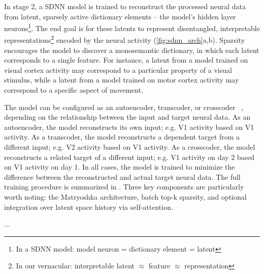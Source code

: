 In stage 2, a SDNN model is trained to reconstruct the processed neural data from latent, sparsely active dictionary elements -- the model's hidden layer neurons\footnote{In a SDNN model: model neuron = dictionary element = latent}. The end goal is for these latents to represent disentangled, interpretable representations\footnote{In our vernacular: interpretable latent $\approx$ feature $\approx$ representation} encoded by the neural activity (\autoref{fig:sdnn_arch}a,b). Sparsity encourages the model to discover a monosemantic dictionary, in which each latent corresponds to a single feature. For instance, a latent from a model trained on visual cortex activity may correspond to a particular property of a visual stimulus, while a latent from a model trained on motor cortex activity may correspond to a specific aspect of movement.

The model can be configured as an autoencoder, transcoder, or crosscoder ~\cite{lindsey_2024_crosscoders}, depending on the relationship between the input and target neural data. As an autoencoder, the model reconstructs its own input; e.g. V1 activity based on V1 activity. As a transcoder, the model reconstructs a dependent target from a different input; e.g. V2 activity based on V1 activity. As a crosscoder, the model reconstructs a related target of a different input; e.g. V1 activity on day 2 based on V1 activity on day 1. In all cases, the model is trained to minimize the difference between the reconstructed and actual target neural data. The full training procedure is summarized in . Three key components are particularly worth noting: the Matryoshka architecture, batch top-k sparsity, and optional integration over latent space history via self-attention.

...

